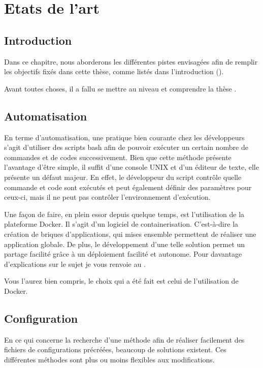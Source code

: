 \chapter{Etats de l'art}
\label{ch:state_art}

\section{Introduction}
Dans ce chapitre, nous aborderons les différentes pistes envisagées afin de remplir les objectifs fixés dans cette thèse, comme listés dans l'introduction ().

Avant toutes choses, il a fallu se mettre au niveau et comprendre la thèse \thLeite.

\section{Automatisation}
En terme d'automatisation, une pratique bien courante chez les développeurs s'agit d'utiliser des scripts bash afin de pouvoir exécuter un certain nombre de commandes et de codes successivement. Bien que cette méthode présente l'avantage d'être simple, il suffit d'une console UNIX et d'un éditeur de texte, elle présente un défaut majeur. En effet, le développeur du script contrôle quelle commande et code sont exécutés et peut également définir des paramètres pour ceux-ci, mais il ne peut pas contrôler l'environnement d'exécution.

Une façon de faire, en plein essor depuis quelque temps, est l'utilisation de la plateforme Docker. Il s'agit d'un logiciel de containerisation. C'est-à-dire la création de briques d'applications, qui mises ensemble permettent de réaliser une application globale. De plus, le développement d'une telle solution permet un partage facilité grâce à un déploiement facilité et autonome. Pour davantage d'explications sur le sujet je vous renvoie au  .

Vous l'aurez bien compris, le choix qui a été fait est celui de l'utilisation de Docker.

\section{Configuration}

En ce qui concerne la recherche d'une méthode afin de réaliser facilement des fichiers de configurations précréées, beaucoup de solutions existent. Ces différentes méthodes sont plus ou moins flexibles aux modifications.

